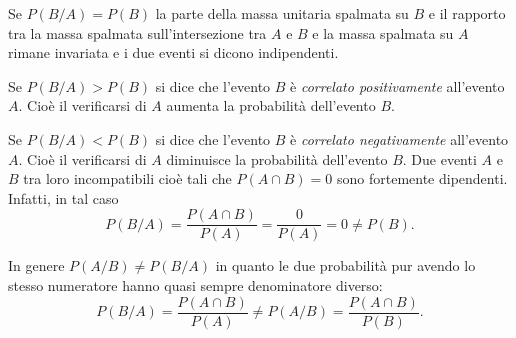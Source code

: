 Se $P(B/A)=P(B)$ la parte della massa unitaria spalmata su $B$ e il rapporto tra la massa spalmata sull'intersezione tra $A$ e $B$ e la massa spalmata su $A$ rimane invariata e i due eventi si dicono indipendenti.

Se $P(B/A)>P(B)$ si dice che l'evento $B$ è \emph{correlato positivamente} all'evento $A$. Cioè il verificarsi di $A$ aumenta la probabilità dell'evento $B$.

Se $P(B/A)<P(B)$ si dice che l'evento $B$ è \emph{correlato negativamente} all'evento $A$. Cioè il verificarsi di $A$ diminuisce la probabilità dell'evento $B$.
\osservazione Due eventi $A$ e $B$ tra loro incompatibili cioè tali che $P(A\cap B)=0$ sono fortemente dipendenti. Infatti, in tal caso
\[P(B/A)=\frac{P(A\cap B)}{P(A)}=\frac 0{P(A)}=0\neq P(B).\]

In genere $P(A/B)\neq P(B/A)$ in quanto le due probabilità pur avendo lo stesso numeratore hanno quasi sempre denominatore diverso: 
\[P(B/A)=\frac{P(A\cap B)}{P(A)}\neq P(A/B)=\frac{P(A\cap B)}{P(B)}.\]

